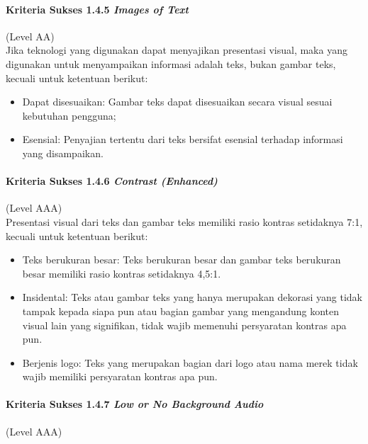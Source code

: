 \documentclass[a4paper,twoside]{article}
\begin{document}
\begin{enumerate}
		\paragraph{Kriteria Sukses 1.4.5 \textit{Images of Text}}
		\label{sec:kriteria_sukses_1.4.5}
		(Level AA)\\

		Jika teknologi yang digunakan dapat menyajikan presentasi visual, maka yang digunakan untuk menyampaikan informasi adalah teks, bukan gambar teks, kecuali untuk ketentuan berikut:

		\begin{itemize}
			\item Dapat disesuaikan: Gambar teks dapat disesuaikan secara visual sesuai kebutuhan pengguna;
			\item Esensial: Penyajian tertentu dari teks bersifat esensial terhadap informasi yang disampaikan.
		\end{itemize}

		\paragraph{Kriteria Sukses 1.4.6 \textit{Contrast (Enhanced)}}
		\label{sec:kriteria_sukses_1.4.6}
		(Level AAA)\\

		Presentasi visual dari teks dan gambar teks memiliki rasio kontras setidaknya 7:1, kecuali untuk ketentuan berikut:

		\begin{itemize}
			\item Teks berukuran besar: Teks berukuran besar dan gambar teks berukuran besar memiliki rasio kontras setidaknya 4,5:1.
			\item Insidental: Teks atau gambar teks yang hanya merupakan dekorasi yang tidak tampak kepada siapa pun atau bagian gambar yang mengandung konten visual lain yang signifikan, tidak wajib memenuhi persyaratan kontras apa pun.
			\item Berjenis logo: Teks yang merupakan bagian dari logo atau nama merek tidak wajib memiliki persyaratan kontras apa pun.
		\end{itemize}

		\paragraph{Kriteria Sukses 1.4.7 \textit{Low or No Background Audio}}
		\label{sec:kriteria_sukses_1.4.7}
		(Level AAA)\\


\end{enumerate}
\end{document}
